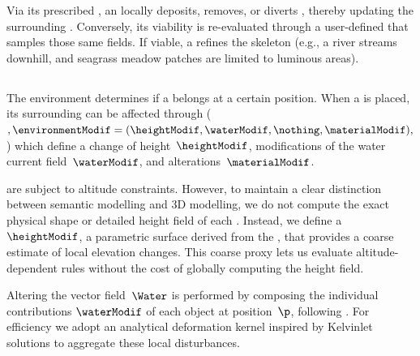 
Via its prescribed , an  locally deposits, removes, or diverts , thereby updating the surrounding . Conversely, its viability is re-evaluated through a user-defined  that samples those same fields. If viable, a  refines the skeleton (e.g., a river streams downhill, and seagrass meadow patches are limited to luminous areas).

\subsection{}

The environment determines if a  belongs at a certain position.
When a  is placed, its surrounding  can be affected through  ($,\environmentModif = (\heightModif, \waterModif, \nothing, \materialModif),$) which define a change of height~$\heightModif$, modifications of the water current field~$\waterModif$, and  alterations~$\materialModif$.

 are subject to altitude constraints.
However, to maintain a clear distinction between semantic modelling and 3D modelling, we do not compute the exact physical shape or detailed height field of each .
Instead, we define a ~$\heightModif$, a parametric surface derived from the , that provides a coarse estimate of local elevation changes. This coarse proxy lets us evaluate altitude-dependent rules without the cost of globally computing the height field.

Altering the vector field~$\Water$ is performed by composing the individual contributions $\waterModif$ of each object at position~$\p$, following \cite{Wejchert1991}. For efficiency we adopt an analytical deformation kernel inspired by Kelvinlet solutions \cite{DeGoes2017} to aggregate these local disturbances.


